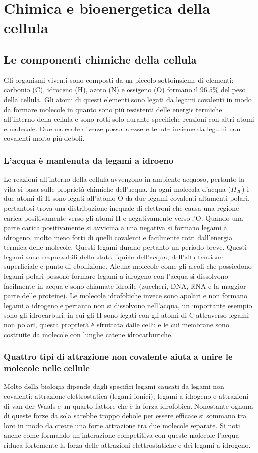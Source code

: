 \chapter{Chimica e bioenergetica della cellula}
\section{Le componenti chimiche della cellula}
Gli organismi viventi sono composti da un piccolo sottoinsieme di elementi: carbonio (C), idroceno (H), azoto (N) e ossigeno (O) formano il $96.5\%$ del peso della cellula. Gli atomi di
questi elementi sono legati da legami covalenti in modo da formare molecole in quanto sono pi\`u resistenti delle energie termiche all'interno della cellula e sono rotti solo durante
specifiche reazioni con altri atomi e molecole. Due molecole diverse possono essere tenute insieme da legami non covalenti molto pi\`u deboli.
\subsection{L'acqua \`e mantenuta da legami a idroeno}
Le reazioni all'interno della cellula avvengono in ambiente acquoso, pertanto la vita si basa sulle propriet\`a chimiche dell'acqua. In ogni molecola d'acqua ($H_20$) i due atomi di 
H sono legati all'atomo O da due legami covalenti altamenti polari, pertantosi trova una distribuzione inequale di elettroni che causa una regione carica positivamente verso gli atomi H
e negativamente verso l'O. Quando una parte carica positivamente si avvicina a una negativa si formano legami a idrogeno, molto meno forti di quelli covalenti e facilmente rotti 
dall'energia termica delle molecole. Questi legami durano pertanto un periodo breve. Questi legami sono responsabili dello stato liquido dell'acqua, dell'alta tensione superficiale e 
punto di ebollizione. Alcune molecole come gli alcoli che possiedono legami polari possono formare legami a idrogeno con l'acqua si dissolvono facilmente in acqua e sono chiamate 
idrofile (zuccheri, DNA, RNA e la maggior parte delle proteine). Le molecole idrofobiche invece sono apolari e non formano legami a idrogeno e pertanto non si dissolvono nell'acqua, un
importante esempio sono gli idrocarburi, in cui gli H sono legati con gli atomi di C attraverso legami non polari, questa propriet\`a \`e sfruttata dalle cellule le cui membrane sono 
costruite da molecole con lunghe catene idrocarburiche.
\subsection{Quattro tipi di attrazione non covalente aiuta a unire le molecole nelle cellule}
Molto della biologia dipende dagli specifici legami causati da legami non covalenti: attrazione elettrostatica (legami ionici), legami a idrogeno e attrazioni di van der Waals e un 
quarto fattore che \`e la forza idrofobica. Nonostante ognuna di queste forze da sola sarebbe troppo debole per essere efficace si sommano tra loro in modo da creare una forte attrazione
tra due molecole separate. Si noti anche come formando un'interazione competitiva con queste molecole l'acqua riduca fortemente la forza delle attrazioni elettrostatiche e dei legami a 
idrogeno.
